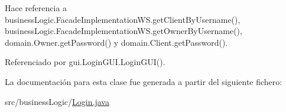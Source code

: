 Hace referencia a business\+Logic.\+Facade\+Implementation\+W\+S.\+get\+Client\+By\+Username(), business\+Logic.\+Facade\+Implementation\+W\+S.\+get\+Owner\+By\+Username(), domain.\+Owner.\+get\+Password() y domain.\+Client.\+get\+Password().



Referenciado por gui.\+Login\+G\+U\+I.\+Login\+G\+U\+I().



La documentación para esta clase fue generada a partir del siguiente fichero\+:\begin{DoxyCompactItemize}
\item 
src/business\+Logic/\mbox{\hyperlink{_login_8java}{Login.\+java}}\end{DoxyCompactItemize}
